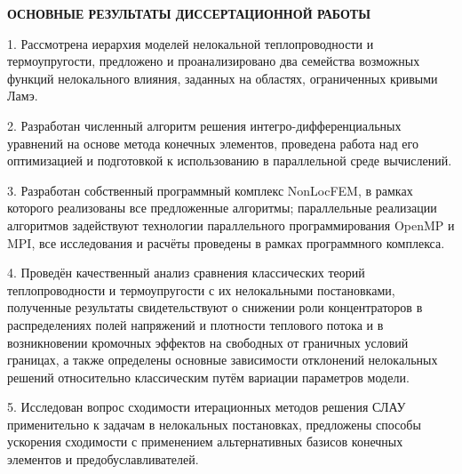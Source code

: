 
\FloatBarrier
{}                                  %
\begin{center}
	\textbf{ОСНОВНЫЕ РЕЗУЛЬТАТЫ ДИССЕРТАЦИОННОЙ РАБОТЫ}
\end{center}

1. Рассмотрена иерархия моделей нелокальной теплопроводности и термоупругости, предложено и проанализировано два семейства возможных функций нелокального влияния, заданных на областях, ограниченных кривыми Ламэ.
	
2. Разработан численный алгоритм решения интегро-дифференциальных уравнений на основе метода конечных элементов, проведена работа над его оптимизацией и подготовкой к использованию в параллельной среде вычислений.
	
3. Разработан собственный программный комплекс NonLocFEM, в рамках которого реализованы все предложенные алгоритмы; параллельные реализации алгоритмов задействуют технологии параллельного программирования OpenMP и MPI, все исследования и расчёты проведены в рамках программного комплекса.
	
4. Проведён качественный анализ сравнения классических теорий теплопроводности и термоупругости с их нелокальными постановками, полученные результаты свидетельствуют о снижении роли концентраторов в распределениях полей напряжений и плотности теплового потока и в возникновении кромочных эффектов на свободных от граничных условий границах, а также определены основные зависимости отклонений нелокальных решений относительно классическим путём вариации параметров модели.
	
5. Исследован вопрос сходимости итерационных методов решения СЛАУ применительно к задачам в нелокальных постановках, предложены способы ускорения сходимости с применением альтернативных базисов конечных элементов и предобуславливателей.
%


